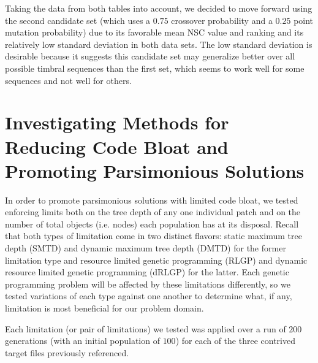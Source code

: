 \documentclass[12pt]{report} 	%
\numberwithin{figure}{chapter}
\numberwithin{table}{chapter}
\numberwithin{equation}{chapter}
\begin{document}
\begin{flushleft}
Taking the data from both tables into account, we decided to move forward using the second candidate set (which uses a $0.75$ crossover probability and a $0.25$ point mutation probability) due to its favorable mean NSC value and ranking and its relatively low standard deviation in both data sets. The low standard deviation is desirable because it suggests this candidate set may generalize better over all possible timbral sequences than the first set, which seems to work well for some sequences and not well for others.

\vspace{12pt}\section{Investigating Methods for Reducing Code Bloat and Promoting Parsimonious Solutions}
In order to promote parsimonious solutions with limited code bloat, we tested enforcing limits both on the tree depth of any one individual patch and on the number of total objects (i.e. nodes) each population has at its disposal. Recall that both types of limitation come in two distinct flavors: static maximum tree depth (SMTD) and dynamic maximum tree depth (DMTD) for the former limitation type and resource limited genetic programming (RLGP) and dynamic resource limited genetic programming (dRLGP) for the latter. Each genetic programming problem will be affected by these limitations differently, so we tested variations of each type against one another to determine what, if any, limitation is most beneficial for our problem domain. 

Each limitation (or pair of limitations) we tested was applied over a run of $200$ generations (with an initial population of $100$) for each of the three contrived target files previously referenced.


\end{flushleft}
\end{document}

